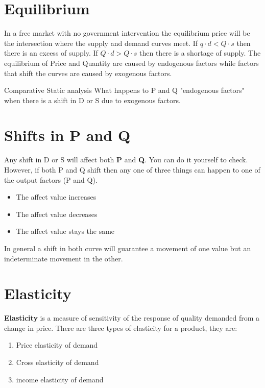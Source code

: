 \documentclass[../ECON-281-Notes.tex]{subfiles}
\begin{document}
\section{Equilibrium}
In a free market with no government intervention the equilibrium price will be the intersection where the supply and demand curves meet.
If $q\cdot d < Q\cdot s$ then there is an excess of supply. If $Q\cdot  d > Q\cdot  s$ then there is a shortage of supply. 
The equilibrium of Price and Quantity are caused by endogenous factors while factors that shift the curves are caused by exogenous factors.

\begin{DndSidebar}[color=PhbLightGreen]{Comparative Static analysis }
  What happens to P and Q "endogenous factors" when there is a shift in D or S due to exogenous factors.
\end{DndSidebar}

\section{Shifts in P and Q}
Any shift in D or S will affect both \textbf{P} and \textbf{Q}.
You can do it yourself to check.
However, if both P and Q shift then any one of three things can happen to one of the output factors (P and Q).
\begin{itemize}
  \item The affect value increases
  \item The affect value decreases
  \item The affect value stays the same  
\end{itemize}
In general a shift in both curve will guarantee a movement of one value but an indeterminate movement in the other.

\section{Elasticity}
\textbf{Elasticity} is a measure of sensitivity of the response of quality demanded from a change in price.
There are three types of elasticity for a product, they are:
\begin{enumerate}
  \item Price elasticity of demand
  \item Cross elasticity of demand
  \item income elasticity of demand
\end{enumerate}
\newpage
\end{document}
